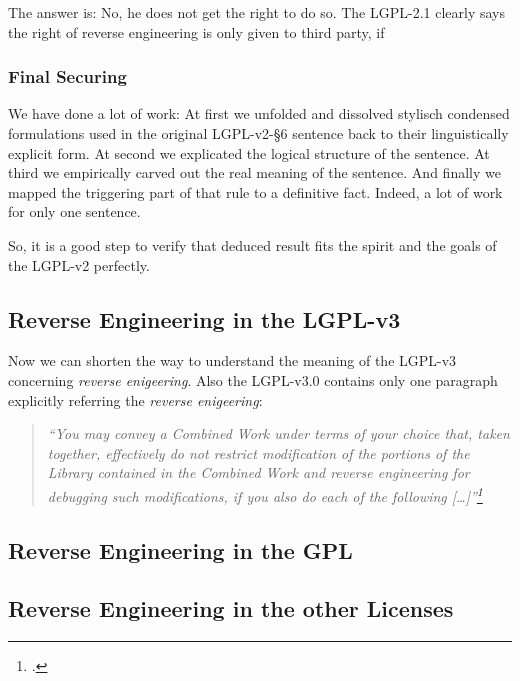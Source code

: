 The answer is: No, he does not get the right to do so. The LGPL-2.1 clearly says
the right of reverse engineering is only given to third party, if 

\subsubsection{Final Securing}

We have done a lot of work: At first we unfolded and dissolved stylisch
condensed formulations used in the original LGPL-v2-§6 sentence back to their
linguistically explicit form. At second we explicated the logical structure of
the sentence. At third we empirically carved out the real meaning of the
sentence. And finally we mapped the triggering part of that rule to a definitive
fact. Indeed, a lot of work for only one sentence.

So, it is a good step to verify that deduced result fits the spirit and the
goals of the LGPL-v2 perfectly.


\subsection{Reverse Engineering in the LGPL-v3}

Now we can shorten the way to understand the meaning of the LGPL-v3 concerning
\emph{reverse enigeering}. Also the LGPL-v3.0 contains only one paragraph
explicitly referring the \emph{reverse enigeering}:


\begin{quote}\emph{
\enquote{You may convey a Combined Work under terms of your choice that,
taken together, effectively \emph{do not restrict} modification of the portions
of the Library contained in the Combined Work and \emph{reverse engineering} for
debugging such modifications, if you also do each of the following
[\ldots]}\footcite[cf.][\nopage wp]{Lgpl30OsiLicense2007a}}
\end{quote}


\subsection{Reverse Engineering in the GPL}

\subsection{Reverse Engineering in the other Licenses}













%

